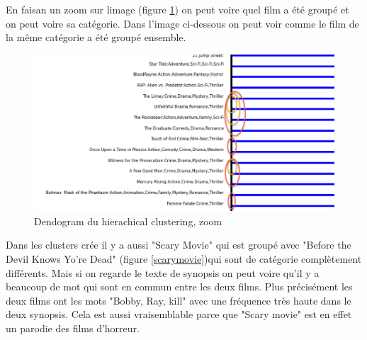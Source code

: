 	En faisan un zoom sur limage (figure \ref{zoom}) on peut voire quel film a été groupé et on peut voire sa catégorie. Dans l'image ci-dessous on peut voir comme le film de la même catégorie a été groupé ensemble.
		\begin{figure}[h]
		  \centering
		    \includegraphics[width=1\linewidth]{img/zoom.png}
		  \caption{Dendogram du hierachical clustering, zoom}
		  \label{zoom}
		\end{figure}
		\newpage
	Dans les clusters crée il y a aussi "Scary Movie" qui est groupé avec "Before the Devil Knows Yo're Dead" (figure \ref{scarymovie})qui sont de catégorie complètement différents. Mais si on regarde le texte de synopsis on peut voire qu’il y a beaucoup de mot qui sont en commun entre les deux films. Plus précisément les deux films ont les mots "Bobby, Ray, kill" avec une fréquence très haute dans le deux synopsis. Cela est aussi vraisemblable parce que "Scary movie" est en effet un parodie des films d'horreur. 	
	 
